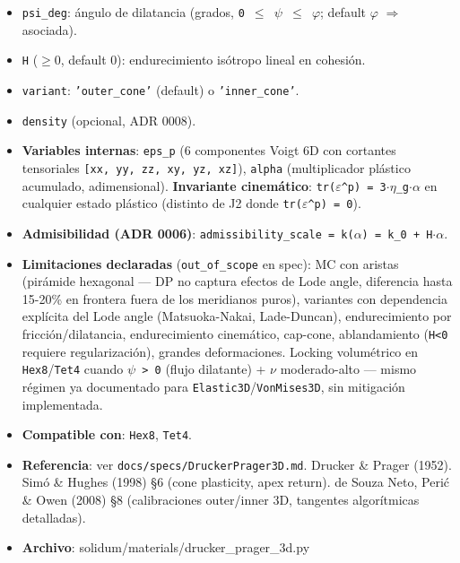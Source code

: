 \documentclass[11pt,letterpaper,oneside]{report}
\begin{document}
\begin{itemize}
  \item \texttt{psi\_deg}: ángulo de dilatancia (grados, \texttt{0 \ensuremath{\le} \ensuremath{\psi} \ensuremath{\le} \ensuremath{\varphi}}; default \texttt{\ensuremath{\varphi}} \ensuremath{\Rightarrow} asociada).
  \item \texttt{H} (\ensuremath{\ge}0, default 0): endurecimiento isótropo lineal en cohesión.
  \item \texttt{variant}: \texttt{'outer\_cone'} (default) o \texttt{'inner\_cone'}.
  \item \texttt{density} (opcional, ADR 0008).
  \item \textbf{Variables internas}: \texttt{eps\_p} (6 componentes Voigt 6D con cortantes tensoriales \texttt{[xx, yy, zz, xy, yz, xz]}), \texttt{alpha} (multiplicador plástico acumulado, adimensional). \textbf{Invariante cinemático}: \texttt{tr(\ensuremath{\varepsilon}\textasciicircum{}p) = 3\ensuremath{\cdot}\ensuremath{\eta}\_g\ensuremath{\cdot}\ensuremath{\alpha}} en cualquier estado plástico (distinto de J2 donde \texttt{tr(\ensuremath{\varepsilon}\textasciicircum{}p) = 0}).
  \item \textbf{Admisibilidad (ADR 0006)}: \texttt{admissibility\_scale = k(\ensuremath{\alpha}) = k\_0 + H\ensuremath{\cdot}\ensuremath{\alpha}}.
  \item \textbf{Limitaciones declaradas} (\texttt{out\_of\_scope} en spec): MC con aristas (pirámide hexagonal --- DP no captura efectos de Lode angle, diferencia hasta 15-20\% en frontera fuera de los meridianos puros), variantes con dependencia explícita del Lode angle (Matsuoka-Nakai, Lade-Duncan), endurecimiento por fricción/dilatancia, endurecimiento cinemático, cap-cone, ablandamiento (\texttt{H<0} requiere regularización), grandes deformaciones. Locking volumétrico en \texttt{Hex8}/\texttt{Tet4} cuando \texttt{\ensuremath{\psi} > 0} (flujo dilatante) + \texttt{\ensuremath{\nu}} moderado-alto --- mismo régimen ya documentado para \texttt{Elastic3D}/\texttt{VonMises3D}, sin mitigación implementada.
  \item \textbf{Compatible con}: \texttt{Hex8}, \texttt{Tet4}.
  \item \textbf{Referencia}: ver \texttt{docs/specs/DruckerPrager3D.md}. Drucker \& Prager (1952). Simó \& Hughes (1998) §6 (cone plasticity, apex return). de Souza Neto, Perić \& Owen (2008) §8 (calibraciones outer/inner 3D, tangentes algorítmicas detalladas).
  \item \textbf{Archivo}: solidum/materials/drucker\_prager\_3d.py
\end{itemize}
\end{document}
